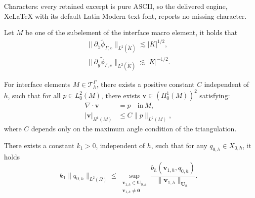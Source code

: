 \documentclass[10pt,a4paper]{amsart}
\begin{document}
Characters: every retained excerpt is pure ASCII, so the delivered engine, XeLaTeX with its default Latin Modern text font, reports no missing character.
\begin{lemma}\label{lem:basis-est}
	Let $M$ be one of the subelement of the interface macro element, it holds that
	\begin{align}
		\|\partial_{\tilde{x}} \tilde{\phi}_{\Gamma,e}\|_{L^2(\tilde{K})} \lesssim |K|^{1/2},\\
		\|\partial_{\tilde{y}} \tilde{\phi}_{\Gamma,e}\|_{L^2(\tilde{K})} \lesssim |K|^{-1/2}.
	\end{align} 
\end{lemma}

\begin{lemma}\label{le:div}
	For interface elements $M \in \mathcal{T}_h^{\Gamma}$, there exists a positive constant $C$ independent of $h$, such that for all $p \in L^2_0(M)$, there exists $\bm{v} \in (H^1_0(M))^2$ satisfying:
	\begin{align}
		\nabla \cdot \bm{v} &= p \quad \mathrm{in}\, M, \\
		|\bm{v}|_{H^1(M)} &\leq C \|p\|_{L^2(M)},
	\end{align}
	where $C$ depends only on the maximum angle condition of the triangulation.
\end{lemma}

\begin{lemma}\label{le:sup1}
	There exists a constant $k_1 > 0$, independent of $h$, such that for any $q_{0,h} \in X_{0,h}$, it holds
	\begin{equation}
		k_1\| q_{0,h} \|_{L^2(\Omega)} \leq \sup_{\substack{\boldsymbol{v}_{1,h} \in \boldsymbol{U}_{0,h} \\ \boldsymbol{v}_{1,h} \neq \bm{0}}} \frac{b_h(\boldsymbol{v}_{1,h}, q_{0,h})}{\|\boldsymbol{v}_{1,h}\|_{\boldsymbol{U}_{h}}}.
	\end{equation}
\end{lemma}
\end{document}
